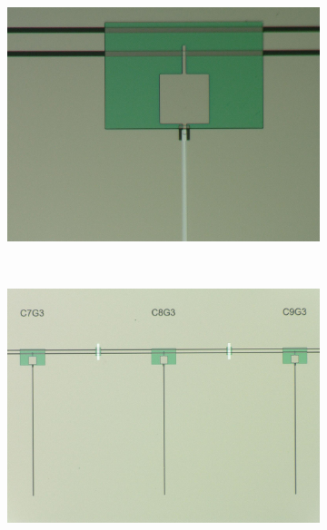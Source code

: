 \begin{figure}[h!!!!!!!!!!!!!!]
    \centering
    \begin{subfigure}[t]{0.48
    \textwidth}
        \includegraphics[width=\textwidth]{figures/ch4_design/chip11_19.jpg}
        \caption{}
        \label{fig:ch3_grVStlsgeochange}
    \end{subfigure}
    ~ 
    \begin{subfigure}[t]{0.48\textwidth}
        \includegraphics[width=\textwidth]{figures/ch4_design/chip11_20.jpg}
        \caption{}
        \label{fig:ch3_grVStlsreadPchange}
    \end{subfigure}
    \centering
    \begin{subfigure}[t]{0.48
    \textwidth}

\end{subfigure}
\end{figure}
